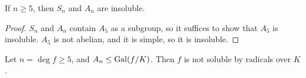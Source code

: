\begin{proposition}
	If \( n \geq 5 \), then \( S_n \) and \( A_n \) are insoluble.
\end{proposition}
\begin{proof}
	\( S_n \) and \( A_n \) contain \( A_5 \) as a subgroup, so it suffices to show that \( A_5 \) is insoluble.
	\( A_5 \) is not abelian, and it is simple, so it is insoluble.
\end{proof}
\begin{corollary}
	Let \( n = \deg f \geq 5 \), and \( A_n \leq \operatorname{Gal}(f/K) \).
	Then \( f \) is not soluble by radicals over \( K \).
\end{corollary}

